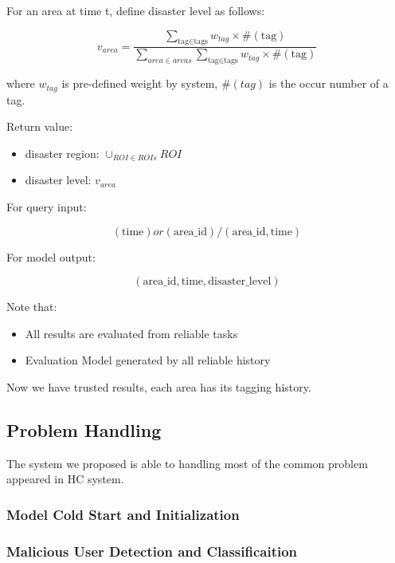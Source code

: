     For an area at time t, define disaster level as follows:

    \[
    v_{area} = \frac{
    \sum_{\text{tag}\in\text{tags}}
      {w_{tag}\times\#(\text{tag})}
    }
    {\sum_{area\in areas}{\sum_{\text{tag}\in\text{tags}}{w_{tag}\times\#(\text{tag})}}}
    \]

    where $w_{tag}$ is pre-defined weight by system, $\#(tag)$ is the occur number of a tag.

    Return value:

    \begin{itemize}
      \item disaster region: $\cup_{ROI\in ROIs}{ROI}$
      \item disaster level: $v_{area}$
    \end{itemize}


    For query input:

    \[
    (\text{time}) or (\text{area\_id})/(\text{area\_id}, \text{time})
    \]

    For model output:

    \[
    (\text{area\_id}, \text{time}, \text{disaster\_level})
    \]

    Note that:

    \begin{itemize}
      \item All results are evaluated from reliable tasks
      \item Evaluation Model generated by all reliable history
    \end{itemize}

    Now we have trusted results, each area has its tagging history.


\subsection{Problem Handling}

The system we proposed is able to handling most of the common problem appeared in HC system.

\subsubsection{Model Cold Start and Initialization}

\subsubsection{Malicious User Detection and Classificaition}

